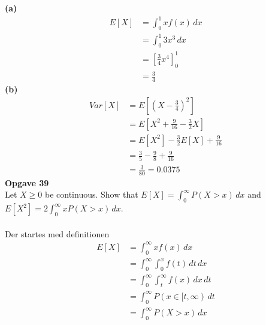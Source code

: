 \documentclass[12pt,a4paper,draft]{report}
\begin{document}
\textbf{(a)}
\begin{align}
E[X]&=\int_0^1\!xf(x)\,dx\\
&=\int_0^1\!3x^3\,dx\\
&=\left[\frac{3}{4}x^4\right]_0^1\\
&=\frac{3}{4}
\end{align}
\textbf{(b)}
\begin{align}
Var[X]&=E[(X-\frac{3}{4})^2]\\
&=E[X^2+\frac{9}{16}-\frac{3}{2}X]\\
&=E[X^2]-\frac{3}{2}E[X]+\frac{9}{16}\\
&=\frac{3}{5}-\frac{9}{8}+\frac{9}{16}\\
&=\frac{3}{80}=0.0375
\end{align}
\textbf{Opgave 39}\\
Let $X\geq 0$ be continuous. Show that $E[X]=\int_0^{\infty}\!P(X>x)\,dx$ and $E[X^2]=2\int_0^{\infty}\!xP(X>x)\,dx$.\\\\
Der startes med definitionen
\begin{align}
E[X]&=\int_0^{\infty}\!xf(x)\,dx\\
&=\int_0^{\infty}\!\int_0^x\!f(t)\,dt\,dx\\
&=\int_0^{\infty}\!\int_t^{\infty}\!f(x)\,dx\,dt\\
&=\int_0^{\infty}\!P(x\in [t,\infty)\,dt\\
&=\int_0^{\infty}\!P(X>x)\,dx
\end{align}
\end{document}
